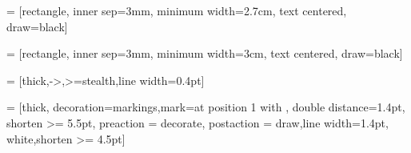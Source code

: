 
\usetikzlibrary{shapes.geometric, arrows, positioning, decorations.markings}

\ifx\devicetype\mobile

 = [rectangle, inner sep=3mm, minimum width=2.7cm, text centered, draw=black]

\else

 = [rectangle, inner sep=3mm, minimum width=3cm, text centered, draw=black]

\fi

 = [thick,->,>=stealth,line width=0.4pt]

 = [thick, decoration={markings,mark=at position
   1 with {}},
   double distance=1.4pt, shorten >= 5.5pt,
   preaction = {decorate},
   postaction = {draw,line width=1.4pt, white,shorten >= 4.5pt}]
